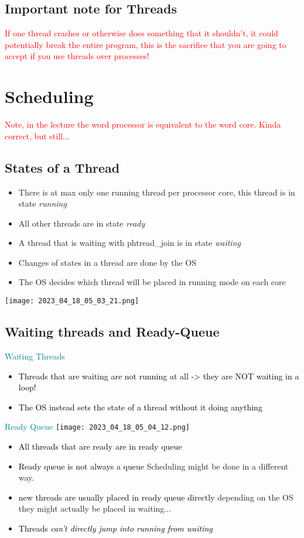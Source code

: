 \documentclass[main.tex,fontsize=8pt,paper=a4,paper=portrait,DIV=calc,]{scrartcl}
\begin{document}
\subsection{Important note for Threads}
\textcolor{red}{If one thread crashes or otherwise does something that it shouldn't, it could potentially break the entire program, this is the sacrifice that you are going to accept if you use threads over processes!}

\section{Scheduling}
\textcolor{red}{Note, in the lecture the word processor is equivalent to the word core. Kinda correct, but still...}
\subsection{States of a Thread}
\begin{itemize}
  \item There is at max only one running thread per processor core, this thread is in state \emph{running}
\item All other threads are in state \emph{ready}
\item A thread that is waiting with phtread\_join is in state \emph{waiting}
\item Changes of states in a thread are done by the OS
\item The OS decides which thread will be placed in running mode on each core
\end{itemize} 
\texttt{[image: 2023\_04\_18\_05\_03\_21.png]}

\subsection{Waiting threads and Ready-Queue}
\textcolor{teal}{Waiting Threads}
\begin{itemize}
\item \textcolor{black}{Threads that are waiting are not running at all -> they are NOT waiting in a loop!}
\item \textcolor{black}{The OS instead sets the state of a thread without it doing anything}
\end{itemize} 
\textcolor{teal}{Ready Queue}
\texttt{[image: 2023\_04\_18\_05\_04\_12.png]}
\begin{itemize}
\item \textcolor{black}{All threads that are ready are in ready queue}
\item \textcolor{black}{Ready queue is not always a queue}\newline
  Scheduling might be done in a different way.
\item \textcolor{black}{new threads are usually placed in ready queue directly}\newline
  depending on the OS they might actually be placed in waiting...
\item \textcolor{black}{Threads \emph{can't directly jump into running from waiting}}
\end{itemize} 
\end{document}
